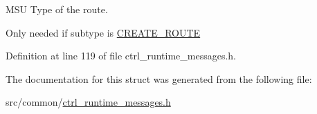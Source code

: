 M\-S\-U Type of the route. 

Only needed if subtype is \hyperlink{ctrl__runtime__messages_8h_ad951c7380db78ed80db2c2484eb7daa8af3b7ba89a90883322a996a4955044b0a}{C\-R\-E\-A\-T\-E\-\_\-\-R\-O\-U\-T\-E} 

Definition at line 119 of file ctrl\-\_\-runtime\-\_\-messages.\-h.



The documentation for this struct was generated from the following file\-:\begin{DoxyCompactItemize}
\item 
src/common/\hyperlink{ctrl__runtime__messages_8h}{ctrl\-\_\-runtime\-\_\-messages.\-h}\end{DoxyCompactItemize}
